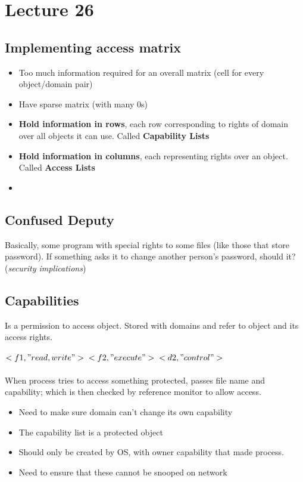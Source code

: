 \documentclass{article}
\begin{document}
	
\section{Lecture 26}
	\subsection{Implementing access matrix}
		\begin{itemize}
			\item Too much information required for an overall matrix (cell for every object/domain pair)
			\item Have sparse matrix (with many 0s)
			\item \textbf{Hold information in rows}, each row corresponding to rights of domain over all objects it can use. Called \textbf{Capability Lists}
			\item \textbf{Hold information in columns}, each representing rights over an object. Called \textbf{Access Lists}
			\item 
		\end{itemize}
		
	\subsection{Confused Deputy}
		Basically, some program with special rights to some files (like those that store password). If something asks it to change another person's password, should it? (\textit{security implications})
		
	\subsection{Capabilities}
		Is a permission to access object. Stored with domains and refer to object and its access rights.\\\\
		$<f1, "read, write"> \\<f2, "execute"> \\<d2, "control">$\\\\
		When process tries to access something protected, passes file name and capability; which is then checked by reference monitor to allow access.
		\begin{itemize}
			\item Need to make sure domain can't change its own capability
			\item The capability list is a protected object
			\item Should only be created by OS, with owner capability that made process.
			\item Need to ensure that these cannot be snooped on network
		\end{itemize}
		
\end{document}
